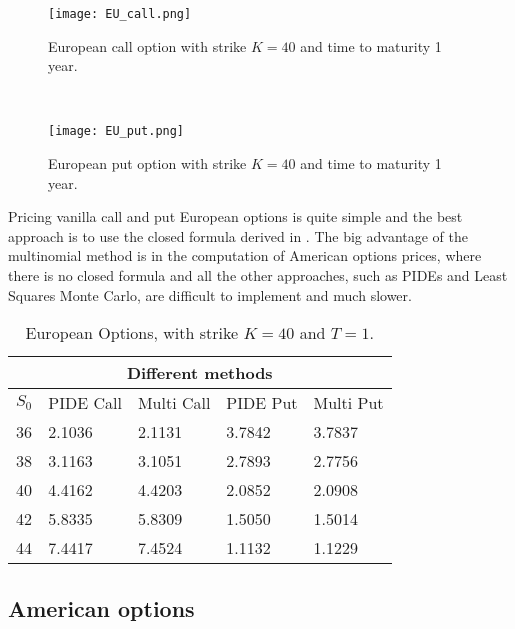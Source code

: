 \begin{figure}[t!]
 \begin{minipage}[b]{0.5\linewidth}
   \centering
 \texttt{[image: EU\_call.png]}
 \caption{European call option with strike $K=40$ and time to maturity 1 year.}
 \label{figCall}
  \end{minipage}
 \ \hspace{2mm} \hspace{3mm} \
 \begin{minipage}[b]{0.5\linewidth}
 \centering
 \texttt{[image: EU\_put.png]}
 \caption{European put option with strike $K=40$ and time to maturity 1 year.}
 \label{figPut}
 \end{minipage}
\end{figure}

\begin{Remark}
Pricing vanilla call and put European options is quite simple and the best approach is to use the closed formula derived in \cite{MCC98}.
The big advantage of the multinomial method is in the computation of American options prices, where there is no closed formula and all the other approaches, 
such as PIDEs and Least Squares Monte Carlo, are difficult to implement and much slower. 
\end{Remark}

\begin{table}[ht]
\centering
{\begin{tabular}{lllll} 
\toprule
\multicolumn{5}{c}{Different methods} \\
\midrule
$S_0$ & PIDE Call & Multi Call & PIDE Put & Multi Put \\
\midrule
36 & 2.1036 & 2.1131 & 3.7842 & 3.7837  \\
  38 & 3.1163 & 3.1051 & 2.7893 & 2.7756 \\
  40 & 4.4162 & 4.4203 & 2.0852 & 2.0908 \\
  42 & 5.8335 & 5.8309 & 1.5050 & 1.5014 \\
  44 & 7.4417 & 7.4524 & 1.1132 & 1.1229 \\
\bottomrule
\end{tabular}}
\caption{European Options, with strike $K=40$ and $T=1$.}
\label{Option_values}
\end{table}



\subsection{American options}

